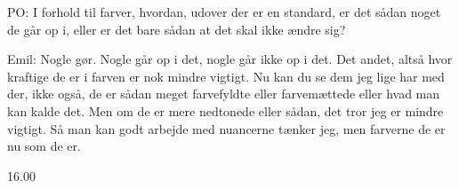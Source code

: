 PO:
I forhold til farver, hvordan, udover der er en standard, er det sådan noget de går op i, eller er det bare sådan at det skal ikke ændre sig?

Emil:
Nogle gør.
Nogle går op i det, nogle går ikke op i det.
Det andet, altså hvor kraftige de er i farven er nok mindre vigtigt.
Nu kan du se dem jeg lige har med der, ikke også, de er sådan meget farvefyldte eller farvemættede eller hvad man kan kalde det.
Men om de er mere nedtonede eller sådan, det tror jeg er mindre vigtigt.  
Så man kan godt arbejde med nuancerne tænker jeg, men farverne de er nu som de er.

16.00








